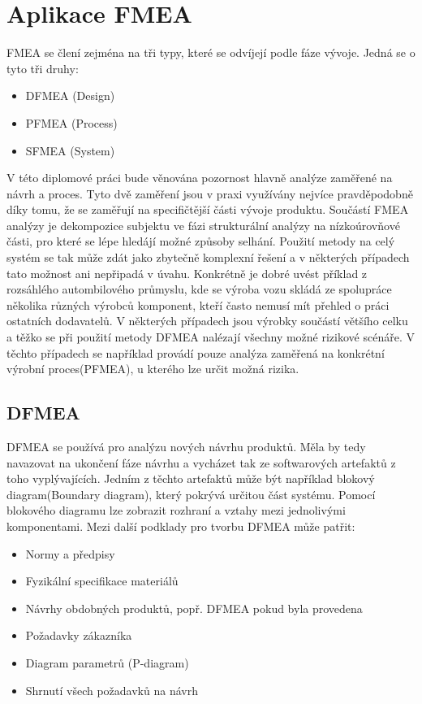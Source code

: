 \section{Aplikace FMEA}

FMEA se člení zejména na tři typy, které se odvíjejí podle fáze vývoje. Jedná se o tyto tři druhy: 

\begin{itemize}
	\item  DFMEA (Design)
	\item  PFMEA (Process)
	\item  SFMEA (System)
\end{itemize}
V této diplomové práci bude věnována pozornost hlavně analýze zaměřené na návrh a proces. Tyto dvě zaměření jsou v praxi využívány nejvíce pravděpodobně díky tomu, že se zaměřují na specifičtější části vývoje produktu. Součástí FMEA analýzy je dekompozice subjektu ve fázi strukturální analýzy na nízkoúrovňové části, pro které se lépe hledájí možné způsoby selhání. Použití metody na celý systém se tak může zdát jako zbytečně komplexní řešení a v některých případech tato možnost ani nepřipadá v úvahu. Konkrétně je dobré uvést příklad z rozsáhlého autombilového průmyslu, kde se výroba vozu skládá ze spolupráce několika různých výrobců komponent, kteří často nemusí mít přehled o práci ostatních dodavatelů. V některých případech jsou výrobky součástí většího celku a těžko se při použití metody DFMEA nalézají všechny možné rizikové scénáře. V těchto případech se například provádí pouze analýza zaměřená na konkrétní výrobní proces(PFMEA), u kterého lze určit možná rizika. 

\subsection{DFMEA}
\label{subsec:DFMEA}
DFMEA se používá pro analýzu nových návrhu produktů. Měla by tedy navazovat na ukončení fáze návrhu a vycházet tak ze softwarových artefaktů z toho vyplývajících. Jedním z těchto artefaktů může být například blokový diagram(Boundary diagram), který pokrývá určitou část systému. Pomocí blokového diagramu lze zobrazit rozhraní a vztahy mezi jednolivými komponentami. Mezi další podklady pro tvorbu DFMEA může patřit: 
\begin{itemize}
	\item  Normy a předpisy
	\item  Fyzikální specifikace materiálů
	\item  Návrhy obdobných produktů, popř. DFMEA pokud byla provedena
	\item  Požadavky zákazníka
	\item  Diagram parametrů (P-diagram)
	\item  Shrnutí všech požadavků na návrh
	
\end{itemize}


